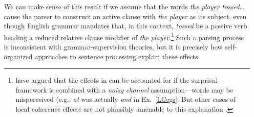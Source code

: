 \documentclass[10pt,letterpaper]{article}
\begin{document}
We can make sense of this result if we assume that the words \emph{the player tossed\dots} cause the parser to construct an active clause with \emph{the player} as its subject, even though English grammar mandates that, in this context, \emph{tossed} be a passive verb heading a reduced relative clause modifier of \emph{the player}.\footnote{ have argued that the effects in  can be accounted for if the surprisal framework is combined with a {\it noisy channel} assumption---words may be misperceived (e.g., \emph{at} was actually \emph{and} in Ex.~\ref{LCegs}. But other cases of local coherence effects are not plausibly amenable to this explanation \cite{kukona2014lexical, paape2015local}.} Such a parsing process is inconsistent with grammar-supervision theories, but it is precisely how self-organized approaches to sentence processing explain these effects.%
\end{document}
